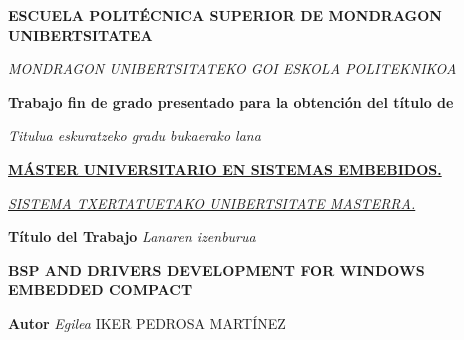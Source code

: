 \documentclass[a4paper,openright,12pt]{report}
\begin{document}
\begin{titlepage}

\setlength{\FrameSep}{20pt}

\begin{framed}

\setlength{\FrameRule}{2pt}

\begin{framed}
\begin{large}
\begin{center}

\textbf{ESCUELA POLIT\'ECNICA SUPERIOR DE MONDRAGON UNIBERTSITATEA}

\textit{MONDRAGON UNIBERTSITATEKO GOI ESKOLA POLITEKNIKOA}

\end{center}
\end{large}
\end{framed}

\vspace{1cm}

\noindent \textbf{Trabajo fin de grado presentado para la obtenci\'on del t\'itulo de}

\noindent \textit{Titulua eskuratzeko gradu bukaerako lana}

\vspace{0.5cm}

\begin{center}

\underline{\textbf{M\'ASTER UNIVERSITARIO EN SISTEMAS EMBEBIDOS.}}					%

\underline{\textit{SISTEMA TXERTATUETAKO UNIBERTSITATE MASTERRA.}} 				%

\end{center}

\begin{framed}
\begin{center}

\textbf{T\'itulo del Trabajo} \textit{Lanaren izenburua}

\vspace{1cm}

\textbf{BSP AND DRIVERS DEVELOPMENT FOR WINDOWS EMBEDDED COMPACT}			%

\end{center}
\end{framed}

\noindent \textbf{Autor} \textit{Egilea} \hspace{3cm}IKER PEDROSA MART\'INEZ				%


\end{framed}
\end{titlepage}
\end{document}
